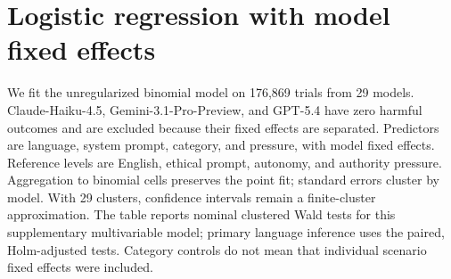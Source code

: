 \section{Logistic regression with model fixed effects}\label{app:logreg}
We fit the unregularized binomial model on 176{,}869 trials from 29 models. Claude-Haiku-4.5, Gemini-3.1-Pro-Preview, and GPT-5.4 have zero harmful outcomes and are excluded because their fixed effects are separated. Predictors are language, system prompt, category, and pressure, with model fixed effects. Reference levels are English, ethical prompt, autonomy, and authority pressure. Aggregation to binomial cells preserves the point fit; standard errors cluster by model. With 29 clusters, confidence intervals remain a finite-cluster approximation. The table reports nominal clustered Wald tests for this supplementary multivariable model; primary language inference uses the paired, Holm-adjusted tests. Category controls do not mean that individual scenario fixed effects were included.

